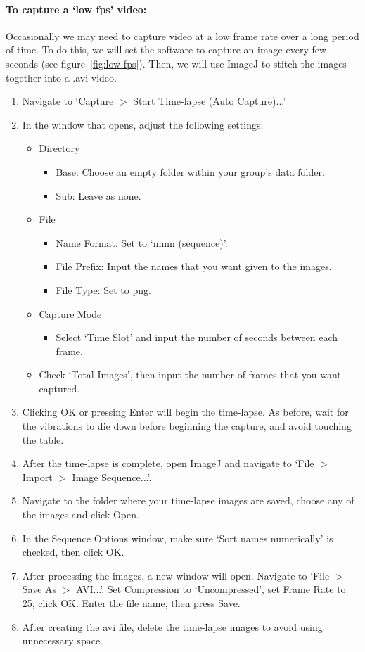 \paragraph*{To capture a `low fps' video:}
Occasionally we may need to capture video at a low frame rate over a long period of time.
To do this, we will set the software to capture an image every few seconds (see figure~\ref{fig:low-fps}).
Then, we will use ImageJ to stitch the images together into a .avi video.
\begin{enumerate}
\itemsep-0.3em
\item Navigate to `Capture $>$ Start Time-lapse (Auto Capture)...'
\item In the window that opens, adjust the following settings:
	\begin{itemize}
	\itemsep-0.3em
	\item Directory
		\begin{itemize}
		\itemsep0em
		\item Base: Choose an empty folder within your group's data folder.
		\item Sub: Leave as none.
		\end{itemize}
	\item File
		\begin{itemize}
		\itemsep0em
		\item Name Format: Set to `nnnn (sequence)'.
		\item File Prefix: Input the names that you want given to the images.
		\item File Type: Set to png.
		\end{itemize}
	\item Capture Mode
		\begin{itemize}
		\itemsep0em
		\item Select `Time Slot' and input the number of seconds between each frame.
		\end{itemize}
	\item Check `Total Images', then input the number of frames that you want captured.
	\end{itemize}
\item Clicking OK or pressing Enter will begin the time-lapse. As before, wait for the vibrations to die down before beginning the capture, and avoid touching the table.
\item After the time-lapse is complete, open ImageJ and navigate to `File $>$ Import $>$ Image Sequence...'.
\item Navigate to the folder where your time-lapse images are saved, choose any of the images and click Open.
\item In the Sequence Options window, make sure `Sort names numerically' is checked, then click OK.
\item After processing the images, a new window will open. Navigate to `File $>$ Save As $>$ AVI...'. Set Compression to `Uncompressed', set Frame Rate to 25, click OK. Enter the file name, then press Save.
\item After creating the avi file, delete the time-lapse images to avoid using unnecessary space.
\end{enumerate}

